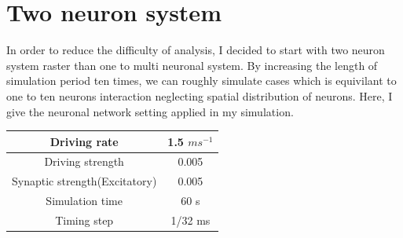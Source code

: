 \documentclass{article}
\begin{document}
	\section{Two neuron system}
		In order to reduce the difficulty of analysis, I decided to start with two neuron system raster than one to multi neuronal system. By increasing the length of simulation period ten times, we can roughly simulate cases which is equivilant to one to ten neurons interaction neglecting spatial distribution of neurons.
		Here, I give the neuronal network setting applied in my simulation.
		\begin{tabular}{c|c}
			\hline
			Driving rate & 1.5 $ms^{-1}$\\
			\hline
			Driving strength & 0.005 \\
			\hline
			Synaptic strength(Excitatory)& 0.005 \\
			\hline
			Simulation time & 60 s\\
			\hline
			Timing step & 1/32 ms \\
			\hline
		\end{tabular}
\end{document}
